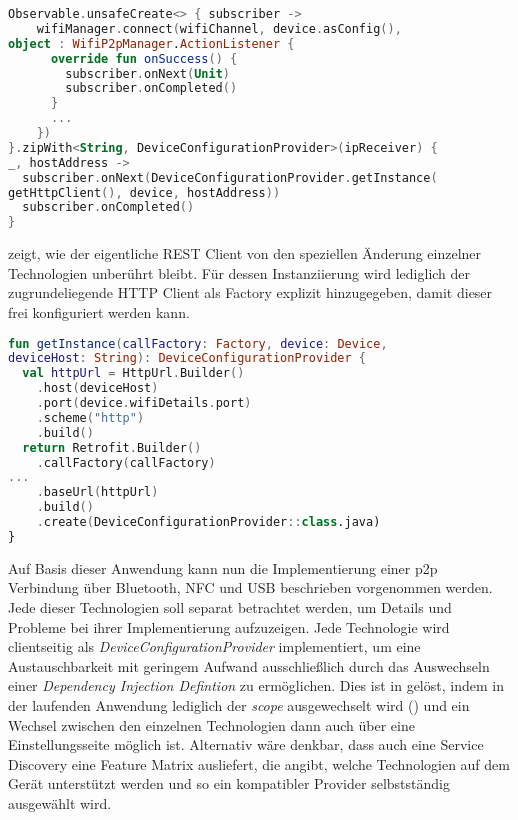         \begin{lstlisting}[frame=bt, label={lst:wifi:rest}, language=Kotlin, caption=Asynchrones Warten für Wi-Fi Direct Verbindung (Clientcode in Kotlin)]
Observable.unsafeCreate<> { subscriber ->
    wifiManager.connect(wifiChannel, device.asConfig(),
object : WifiP2pManager.ActionListener {
      override fun onSuccess() {
        subscriber.onNext(Unit)
        subscriber.onCompleted()
      }
      ...
    })
}.zipWith<String, DeviceConfigurationProvider>(ipReceiver) {
_, hostAddress ->
  subscriber.onNext(DeviceConfigurationProvider.getInstance(
getHttpClient(), device, hostAddress))
  subscriber.onCompleted()
}
        \end{lstlisting}
        
         zeigt, wie der eigentliche REST Client von den speziellen Änderung einzelner Technologien unberührt bleibt. Für dessen Instanziierung wird lediglich der zugrundeliegende HTTP Client als Factory explizit hinzugegeben, damit dieser frei konfiguriert werden kann.
        
        \begin{lstlisting}[frame=bt, label={lst:wifi:client}, language=Kotlin, caption=REST Client Instanziierung (Clientcode in Kotlin)]
fun getInstance(callFactory: Factory, device: Device,
deviceHost: String): DeviceConfigurationProvider {
  val httpUrl = HttpUrl.Builder()
    .host(deviceHost)
    .port(device.wifiDetails.port)
    .scheme("http")
    .build()
  return Retrofit.Builder()
    .callFactory(callFactory)
...
    .baseUrl(httpUrl)
    .build()
    .create(DeviceConfigurationProvider::class.java)
}
        \end{lstlisting}
        
        Auf Basis dieser Anwendung kann nun die Implementierung einer p2p Verbindung über Bluetooth, NFC und USB beschrieben vorgenommen werden. Jede dieser Technologien soll separat betrachtet werden, um Details und Probleme bei ihrer Implementierung aufzuzeigen. Jede Technologie wird clientseitig als {\it DeviceConfigurationProvider} implementiert, um eine Austauschbarkeit mit geringem Aufwand ausschließlich durch das Auswechseln einer {\it Dependency Injection Defintion} zu ermöglichen. Dies ist in  gelöst, indem in der laufenden Anwendung lediglich der {\it scope} ausgewechselt wird () und ein Wechsel zwischen den einzelnen Technologien dann auch über eine Einstellungsseite möglich ist. Alternativ wäre denkbar, dass auch eine Service Discovery eine Feature Matrix ausliefert, die angibt, welche Technologien auf dem Gerät unterstützt werden und so ein kompatibler Provider selbstständig ausgewählt wird.
        
